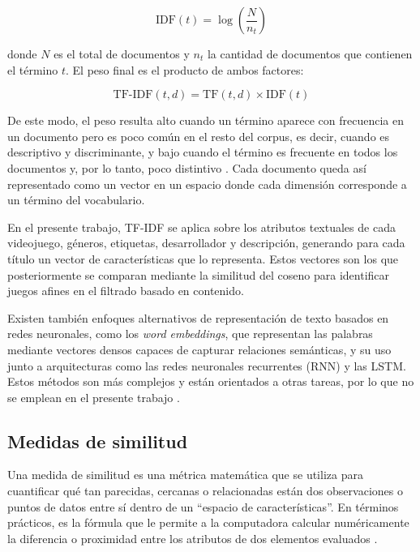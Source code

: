 \begin{equation}\label{eq:idf}
    \text{IDF}(t) = \log\left(\frac{N}{n_t}\right)
\end{equation}

\noindent donde $N$ es el total de documentos y $n_t$ la cantidad de documentos que contienen el término $t$. El peso final es el producto de ambos factores:

\begin{equation}\label{eq:tfidf}
    \text{TF-IDF}(t, d) = \text{TF}(t, d) \times \text{IDF}(t)
\end{equation}

De este modo, el peso resulta alto cuando un término aparece con frecuencia en un documento pero es poco común en el resto del corpus, es decir, cuando es descriptivo y discriminante, y bajo cuando el término es frecuente en todos los documentos y, por lo tanto, poco distintivo \parencite{AlObaydyEtAl2022}. Cada documento queda así representado como un vector en un espacio donde cada dimensión corresponde a un término del vocabulario.

En el presente trabajo, TF-IDF se aplica sobre los atributos textuales de cada videojuego, géneros, etiquetas, desarrollador y descripción, generando para cada título un vector de características que lo representa. Estos vectores son los que posteriormente se comparan mediante la similitud del coseno para identificar juegos afines en el filtrado basado en contenido.

Existen también enfoques alternativos de representación de texto basados en redes neuronales, como los \emph{word embeddings}, que representan las palabras mediante vectores densos capaces de capturar relaciones semánticas, y su uso junto a arquitecturas como las redes neuronales recurrentes (RNN) y las LSTM. Estos métodos son más complejos y están orientados a otras tareas, por lo que no se emplean en el presente trabajo \parencite{GandhiGandhi2022}.

\subsection{Medidas de similitud}\label{subsec:medidas_similitud}

Una medida de similitud es una métrica matemática que se utiliza para cuantificar qué tan parecidas, cercanas o relacionadas están dos observaciones o puntos de datos entre sí dentro de un \enquote{espacio de características}. En términos prácticos, es la fórmula que le permite a la computadora calcular numéricamente la diferencia o proximidad entre los atributos de dos elementos evaluados \parencite{CorreaHenao2021}.

